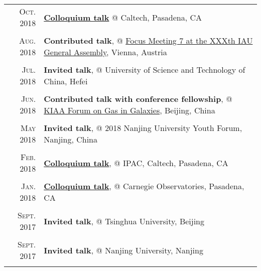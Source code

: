 \documentclass[letterpaper,12pt]{article}
\newcommand{\textwrap}{5.3in}
\begin{document}
\begingroup
\renewcommand\arraystretch{0.3}
\vspace*{-.5em}
\begin{longtable}{r|p{\textwrap}}

    \textsc{Oct. 2018}   &   \href{http://www.astro.caltech.edu/events/tea_talks/tea_2018_2019/abstracts/wang.txt}{\textbf{Colloquium talk}} @ Caltech, Pasadena, CA \\
    \multicolumn{2}{c}{} \\

    \textsc{Aug. 2018}   &   \textbf{Contributed talk}, @ \href{http://www.arcetri.astro.it/fm7/programme.html}{Focus Meeting 7 at the XXXth IAU General Assembly}, Vienna, Austria \\
    \multicolumn{2}{c}{} \\

    \textsc{Jul. 2018}   &   \textbf{Invited talk}, @ University of Science and Technology of China, Hefei \\
    \multicolumn{2}{c}{} \\

    \textsc{Jun. 2018}   &   \textbf{Contributed talk with conference fellowship}, @ \href{http://kiaa.pku.edu.cn/gasingalaxies/?q=program}{KIAA Forum on Gas in Galaxies}, Beijing, China \\
    \multicolumn{2}{c}{} \\

    \textsc{May 2018}   &   \textbf{Invited talk}, @ 2018 Nanjing University Youth Forum, Nanjing, China \\
    \multicolumn{2}{c}{} \\

    \textsc{Feb. 2018}   &   \href{https://www.ipac.caltech.edu/event/358}{\textbf{Colloquium talk}}, @ IPAC, Caltech, Pasadena, CA \\
    \multicolumn{2}{c}{} \\

    \textsc{Jan. 2018}   &   \href{http://obs.carnegiescience.edu/talk_event/828}{\textbf{Colloquium talk}}, @ Carnegie Observatories, Pasadena, CA \\
    \multicolumn{2}{c}{} \\

    \textsc{Sept. 2017}   &   \textbf{Invited talk}, @ Tsinghua University, Beijing \\
    \multicolumn{2}{c}{} \\

    \textsc{Sept. 2017}   &   \textbf{Invited talk}, @ Nanjing University, Nanjing \\
    \multicolumn{2}{c}{} \\


\end{longtable}
\end{document}
